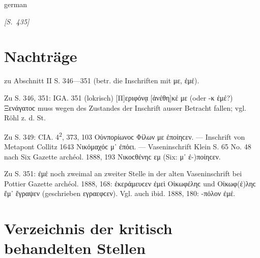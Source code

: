 \begin{otherlanguage*}{german}
\hfill {} \hspace{1ex}

\hypertarget{p435}{\emph{[S.~435]}}\label{p435}

\section*{Nachträge}

zu Abschnitt II S. 346—351 (betr. die Inschriften mit με, ἐμέ).

Zu S. 346, 351: IGA. 351 (lokrisch) [Π]εριφόνᾳ [ἀνέθη]κέ με (oder -κ ἐμέ?) Ξενάγατοϲ muss wegen des Zustandes der Inschrift ausser Betracht fallen; vgl. Röhl z. d. St.

Zu S. 349: CIA. 4\textsuperscript{2}, 373, 103 Οὑνπορίωνοϲ Φίλων με ἐποίηϲεν. — Inschrift von Metapont Collitz 1643 Νικόμαχόϲ μ᾽ ἐπόει. — Vaseninschrift Klein S. 65 No. 48 nach Six Gazette archéol. 1888, 193 Νικοϲθένηϲ εμ (Six: μ᾽ ἐ-)ποίηϲεν.

Zu S. 351: ἐμέ noch zweimal an zweiter Stelle in der alten Vaseninschrift bei Pottier Gazette archéol. 1888, 168: ἐκεράμευϲεν ἐμεὶ Οἰκωφέληϲ und Οἰκωφ(έ)ληϲ ἔμ᾽ ἔγραψεν (geschrieben εγραεφϲεν). Vgl. auch ibid. 1888, 180: -πόλον ἐμέ.

\section*{Verzeichnis der kritisch behandelten Stellen}


\end{otherlanguage*}
